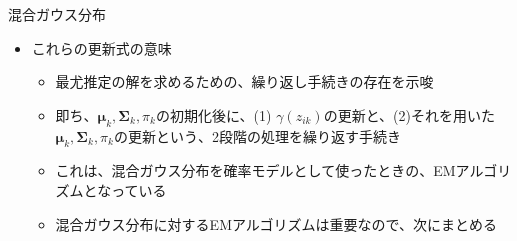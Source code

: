 \documentclass[dvipdfmx,notheorems,t]{beamer}
\begin{document}
\begin{frame}{混合ガウス分布}

\begin{itemize}
	\item これらの更新式の意味
	\begin{itemize}
		\item 最尤推定の解を求めるための、\alert{繰り返し手続きの存在}を示唆
		\item 即ち、$\bm{\mu}_k, \bm{\Sigma}_k, \pi_k$の初期化後に、(1) $\gamma(z_{ik})$の更新と、(2)それを用いた$\bm{\mu}_k, \bm{\Sigma}_k, \pi_k$の更新という、\alert{2段階の処理を繰り返す}手続き
		\newline
		\item これは、混合ガウス分布を確率モデルとして使ったときの、\alert{EMアルゴリズム}となっている
		\newline
		\item 混合ガウス分布に対するEMアルゴリズムは重要なので、次にまとめる
	\end{itemize}
\end{itemize}

\end{frame}
\end{document}
